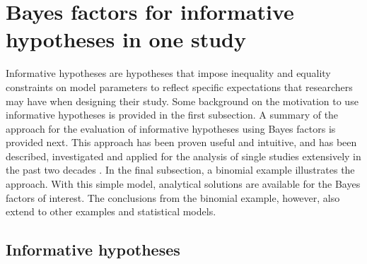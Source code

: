 \documentclass[11pt,reqno]{article}
\begin{document}
\section{Bayes factors for informative hypotheses in one study}
\label{theory}

Informative hypotheses are hypotheses that impose inequality and equality constraints on model parameters to reflect specific expectations that researchers may have when designing their study. Some background on the motivation to use informative hypotheses is provided in the first subsection. A summary of the approach for the evaluation of informative hypotheses using Bayes factors is provided next. This approach has been proven useful and intuitive, and has been described, investigated and applied for the analysis of single studies extensively in the past two decades \autocite{beland2012informative, hoijtink_tutorial_2019, mulder_prior_2014, flore_influence_2018, gu_inequality_2014}. In the final subsection, a binomial example illustrates the approach. With this simple model, analytical solutions are available for the Bayes factors of interest. The conclusions from the binomial example, however, also extend to other examples and statistical models.


\subsection{Informative hypotheses}\label{inf_hyp}
\end{document}
